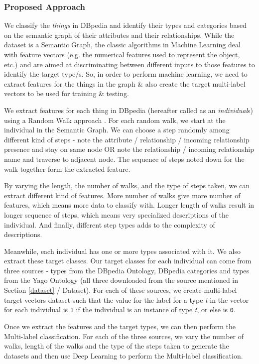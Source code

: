 \documentclass[runningheads,a4paper]{llncs}
\begin{document}
\subsubsection{Proposed Approach}
We classify the \textit{things} in DBpedia and identify their types and categories
based on the semantic graph of 
their attributes and their relationships. 
While the dataset is a Semantic Graph, the classic algorithms in Machine Learning
deal with feature vectors (e.g. the numerical features used to represent the object, etc.) and are aimed
at discriminating between different inputs to those features to identify the target type/s. 
So, in order to perform machine learning, 
we need to extract features for the things in the graph \& also create the
target multi-label vectors to be used for training \& testing. 

We extract features for each thing in DBpedia 
(hereafter called as an \textit{individual}s)
using a Random Walk approach \cite{tsuda2010graph}. For each random walk, we start at the
individual in the Semantic Graph. We can choose a step randomly among different kind of steps - note the attribute / relationship / incoming relationship presence and stay on same node OR note the relationship / incoming relationship name and traverse to adjacent node. The sequence of steps noted down for the walk together form the extracted feature. 

By varying the length, the number of walks, and the type of steps taken, we can extract different kind of features.
More number of walks give more number of features, which means more data to classify with. Longer length of walks result in longer sequence of steps, which means very specialized descriptions of the individual. And finally, different step types adds to the complexity of descriptions.

Meanwhile, each individual
has one or more types  associated with it. We also extract these target classes. Our target classes for each individual can come from three sources - types from the DBpedia Ontology, DBpedia categories
and types from the Yago \cite{suchanek2007yago} Ontology (all three downloaded from the source mentioned in Section \ref{dataset} / Dataset). For each of these sources, we create multi-label target vectors dataset such that the value for the label for a type \textit{t} in the vector for each individual is \texttt{1} if the individual is an instance of type \textit{t}, or else is \texttt{0}.

Once we extract the features and the target types, 
we can then perform the Multi-label classification.  
For each of the three sources, we vary the number of walks, length of the 
walks and the type of the steps taken to generate the datasets and 
then use Deep Learning to perform the Multi-label classification. 
\end{document}
